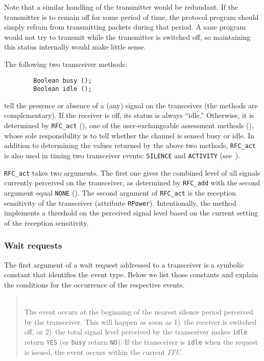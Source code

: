 Note that a similar handling of the transmitter would be redundant.
If the transmitter is to remain off for some period of time, the protocol
program should simply refrain from transmitting packets during that period.
A sane program would not try to transmit while the transmitter is switched
off, so maintaining this status internally would make little sense.

The following two transceiver methods:
\begin{verbatim}
        Boolean busy ();
        Boolean idle ();
\end{verbatim}
\noindent
tell the presence or absence of a (any) signal on the transceiver
(the methods are complementary).
If the receiver is off, its status is always ``idle.''
Otherwise, it is determined by {\tt RFC\_act}
(), one of the user-exchangeable
assessment methods (), whose
sole responsibility is to tell whether the channel is sensed busy or idle.
In addition to determining the values returned by the above two methods,
{\tt RFC\_act} is also used in timing two transceiver events:
{\tt SILENCE} and {\tt ACTIVITY} (see~).

{\tt RFC\_act} takes two arguments.
The first one gives the combined level of all signals currently perceived
on the transceiver, as determined by {\tt RFC\_add} with the second argument
equal {\tt NONE} ().
The second argument of {\tt RFC\_act} is the reception sensitivity of the
transceiver (attribute {\tt RPower}).
Intentionally, the method implements a threshold on the perceived signal
level based on the current setting of the reception sensitivity.

\subsubsection{Wait requests}
\label{rm_tr_pp_wr}

The first argument of a wait request addressed to a transceiver is a symbolic
constant that identifies the event type.
Below we list those constants and explain the conditions for the
occurrence of the respective events.

\medskip

\begin{quote}
\noindent{}\\ \hspace{0in}
The event occurs at the beginning of the nearest silence
period perceived by the transceiver.
This will happen as soon as 1)~the receiver is switched off, or 2)~the
total signal level perceived by the transceiver makes {\tt idle}
return {\tt YES} (or {\tt busy} return {\tt NO}).
If the transceiver is {\tt idle} 
when the request is issued,
the event occurs within the current {\em ITU}.
\end{quote}

